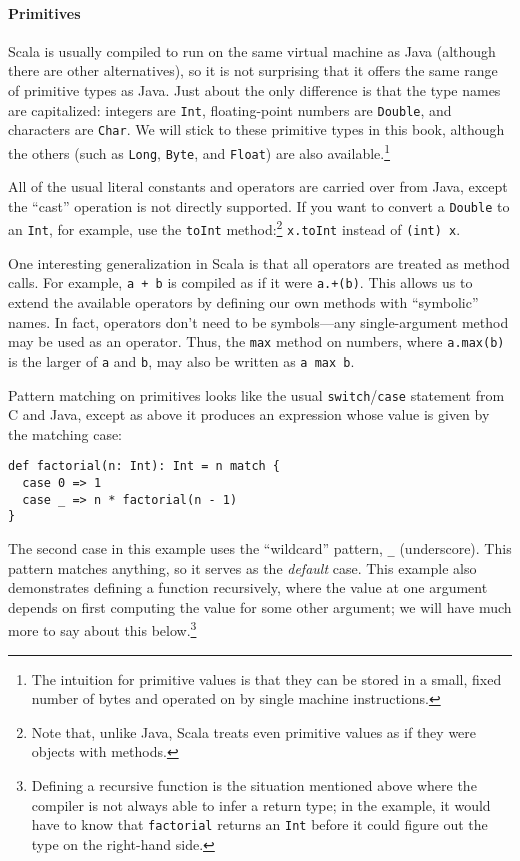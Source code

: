 \paragraph{Primitives}
Scala is usually compiled to run on the same virtual machine as Java (although there are other alternatives), so it is not surprising that it offers the same range of primitive types as Java. Just about the only difference is that the type names are capitalized: integers are \verb|Int|, floating-point numbers are \verb|Double|, and characters are \verb|Char|. We will stick to these primitive types in this book, although the others (such as \verb|Long|, \verb|Byte|, and \verb|Float|) are also available.\footnote{The intuition for primitive values is that they can be stored in a small, fixed number of bytes and operated on by single machine instructions.}

All of the usual literal constants and operators are carried over from Java, except the ``cast'' operation is not directly supported. If you want to convert a \verb|Double| to an \verb|Int|, for example, use the \verb|toInt| method:\footnote{Note that, unlike Java, Scala treats even primitive values as if they were objects with methods.} \verb|x.toInt| instead of \verb|(int) x|.

One interesting generalization in Scala is that all operators are treated as method calls. For example, \verb|a + b| is compiled as if it were \verb|a.+(b)|. This allows us to extend the available operators by defining our own methods with ``symbolic'' names. In fact, operators don't need to be symbols---any single-argument method may be used as an operator. Thus, the \verb|max| method on numbers, where \verb|a.max(b)| is the larger of \verb|a| and \verb|b|, may also be written as \verb|a max b|.

Pattern matching on primitives looks like the usual \verb|switch|/\verb|case| statement from C and Java, except as above it produces an expression whose value is given by the matching case:
\begin{verbatim}
def factorial(n: Int): Int = n match {
  case 0 => 1
  case _ => n * factorial(n - 1)
}
\end{verbatim}
The second case in this example uses the ``wildcard'' pattern, \verb|_| (underscore). This pattern matches anything, so it serves as the \emph{default} case. This example also demonstrates defining a function recursively, where the value at one argument depends on first computing the value for some other argument; we will have much more to say about this below.\footnote{Defining a recursive function is the situation mentioned above where the compiler is not always able to infer a return type; in the example, it would have to know that \texttt{factorial} returns an \texttt{Int} before it could figure out the type on the right-hand side.}

